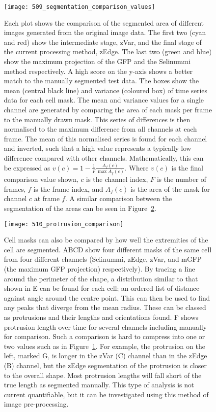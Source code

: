 \begin{figure}[h!]
 \centering
 \texttt{[image: 509\_segmentation\_comparison\_values]}
 \caption[Testing: segmentation area comparison values]{
	Each plot shows the comparison of the segmented area of different images generated from the original image data. The first two (cyan and red) show the intermediate stage, zVar, and the final stage of the current processing method, zEdge. The last two (green and blue) show the maximum projection of the GFP and the Selinummi method respectively. A high score on the y-axis shows a better match to the manually segmented test data. The boxes show the mean (central black line) and variance (coloured box) of time series data for each cell mask. The mean and variance values for a single channel are generated by comparing the area of each mask per frame to the manually drawn mask. This series of differences is then normalised to the maximum difference from all channels at each frame. The mean of this normalised series is found for each channel and inverted, such that a high value represents a typically low difference compared with other channels. Mathematically, this can be expressed as $v(c) = 1 - \frac{1}{F} \frac{A_f(c)}{\max A_f(c)}$. Where $v(c)$ is the final comparison value shown, $c$ is the channel index, $F$ is the number of frames, $f$ is the frame index, and $A_f(c)$ is the area of the mask for channel $c$ at frame $f$. A similar comparison between the segmentation of the areas can be seen in Figure~\ref{fig:protrusioncomparison}.
 }
 \label{fig:areacomparisonvalues}
\end{figure}

\begin{figure}[h!]
 \centering
 \texttt{[image: 510\_protrusion\_comparison]}
 \caption[Testing: protrusion comparison]{
	Cell masks can also be compared by how well the extremities of the cell are segmented. ABCD show four different masks of the same cell from four different channels (Selinummi, zEdge, zVar, and mGFP (the maximum GFP projection) respectively). By tracing a line around the perimeter of the shape, a distribution similar to that shown in E can be found for each cell; an ordered list of distance against angle around the centre point. This can then be used to find any peaks that diverge from the mean radius. These can be classed as protrusions and their lengths and orientations found. F shows protrusion length over time for several channels including manually for comparison. Such a comparison is hard to compress into one or two values such as in Figure~\ref{fig:areacomparisonvalues}. For example, the protrusion on the left, marked G, is longer in the zVar (C) channel than in the zEdge (B) channel, but the zEdge segmentation of the protrusion is closer to the overall shape. Most protrusion lengths will fall short of the true length as segmented manually. This type of analysis is not current quantifiable, but it can be investigated using this method of image pre-processing.
 }
 \label{fig:protrusioncomparison}
\end{figure}

